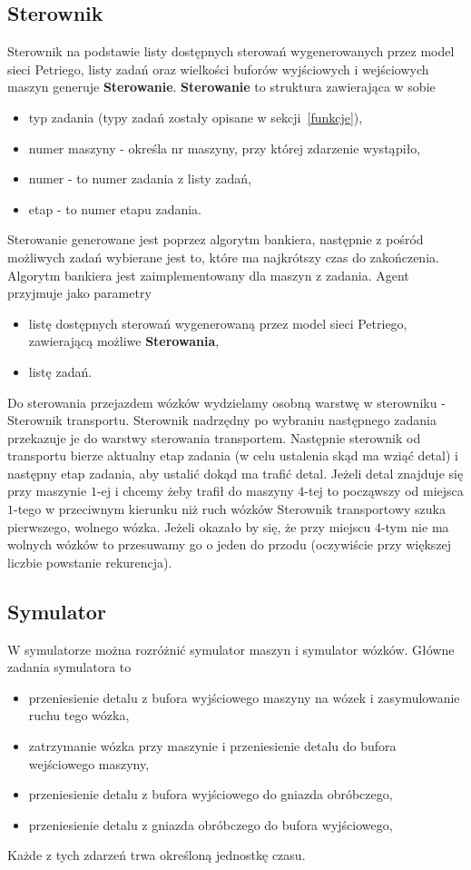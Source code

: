 \documentclass[10pt, a4paper]{article}
\begin{document}
\subsection{Sterownik}
Sterownik na podstawie listy dostępnych sterowań wygenerowanych przez model sieci Petriego, listy zadań oraz wielkości buforów wyjściowych i wejściowych maszyn generuje \textbf{Sterowanie}. \textbf{Sterowanie} to struktura zawierająca w sobie
\begin{itemize}
\item typ zadania (typy zadań zostały opisane w sekcji~\ref{funkcje}),
\item numer maszyny - określa nr maszyny, przy której zdarzenie wystąpiło,
\item numer - to numer zadania z listy zadań,
\item etap - to numer etapu zadania.
\end{itemize}
Sterowanie generowane jest poprzez algorytm bankiera, następnie z pośród możliwych zadań wybierane jest to, które ma najkrótszy czas do zakończenia. Algorytm bankiera jest zaimplementowany dla maszyn z zadania.  Agent przyjmuje jako parametry
\begin{itemize}
\item listę dostępnych sterowań wygenerowaną przez model sieci Petriego, zawierającą możliwe \textbf{Sterowania},
\item listę zadań.
\end{itemize}
Do sterowania przejazdem wózków wydzielamy osobną warstwę w sterowniku - Sterownik transportu. Sterownik nadrzędny po wybraniu następnego zadania przekazuje je do warstwy sterowania transportem. Następnie sterownik od transportu bierze aktualny etap zadania (w celu ustalenia skąd ma wziąć detal) i następny etap zadania, aby ustalić dokąd ma trafić detal. Jeżeli detal znajduje się przy maszynie $1$-ej i chcemy żeby trafił do maszyny $4$-tej to począwszy od miejsca $1$-tego w przeciwnym kierunku niż ruch wózków Sterownik transportowy szuka pierwszego, wolnego wózka. Jeżeli okazało by się, że przy miejscu $4$-tym nie ma wolnych wózków to przesuwamy go o jeden do przodu (oczywiście przy większej liczbie powstanie rekurencja).
\subsection{Symulator}
W symulatorze można rozróżnić symulator maszyn i symulator wózków. Główne zadania symulatora to
\begin{itemize}
\item przeniesienie detalu z bufora wyjściowego maszyny na wózek i zasymulowanie ruchu tego wózka,
\item zatrzymanie wózka przy maszynie i przeniesienie detalu do bufora wejściowego maszyny,
\item przeniesienie detalu z bufora wyjściowego do gniazda obróbczego,
\item przeniesienie detalu z gniazda obróbczego do bufora wyjściowego,
\end{itemize}
Każde z tych zdarzeń trwa określoną jednostkę czasu.
\end{document}
